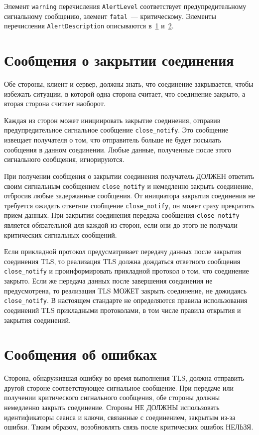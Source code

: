 Элемент \lstinline{warning} перечисления \lstinline{AlertLevel} 
соответствует предупредительному сигнальному сообщению, элемент 
\lstinline{fatal}~--- критическому. Элементы перечисления 
\lstinline{AlertDescription} описываются в~\ref{ALERT.2} и~\ref{ALERT.3}.  
 
\section{Сообщения о закрытии соединения}\label{ALERT.2}

Обе стороны, клиент и сервер, должны знать, что соединение закрывается, 
чтобы избежать ситуации, в которой одна сторона считает, что соединение 
закрыто, а вторая сторона считает наоборот.  

Каждая из сторон может инициировать закрытие соединения, отправив 
предупредительное сигнальное сообщение \lstinline{close_notify}. Это сообщение 
извещает получателя о том, что отправитель больше не будет посылать 
сообщения в данном соединении. Любые данные, полученные после этого 
сигнального сообщения, игнорируются. 

При получении сообщения о закрытии соединения получатель ДОЛЖЕН ответить 
своим сигнальным сообщением \lstinline{close_notify} и немедленно закрыть соединение, 
отбросив любые задержанные сообщения. От инициатора закрытия соединения 
не требуется ожидать ответное сообщение \lstinline{close_notify}, он может сразу 
прекратить прием данных. При закрытии соединения передача сообщения 
\lstinline{close_notify} является обязательной для каждой из сторон, если они до этого 
не получали критических сигнальных сообщений.  

Если прикладной протокол предусматривает передачу данных после закрытия 
соединения TLS, то реализация TLS должна дождаться ответного сообщения 
\lstinline{close_notify} и проинформировать прикладной протокол о том, что соединение 
закрыто. Если же передача данных после завершения соединения не 
предусмотрена, то реализация TLS МОЖЕТ закрыть соединение, не дожидаясь 
\lstinline{close_notify}. В настоящем стандарте не определяются правила использования 
соединений TLS прикладными протоколами, в том числе правила открытия и 
закрытия соединений. 

\section{Сообщения об ошибках}\label{ALERT.3}

Сторона, обнаружившая ошибку во время выполнения TLS, должна отправить 
другой стороне соответствующее сигнальное сообщение. При передаче или 
получении критического сигнального сообщения, обе стороны должны 
немедленно закрыть соединение. Стороны НЕ ДОЛЖНЫ использовать 
идентификаторы сеанса и ключи, связанные с соединением, закрытым из-за 
ошибки. Таким образом, возобновлять связь после критических ошибок 
НЕЛЬЗЯ. 


